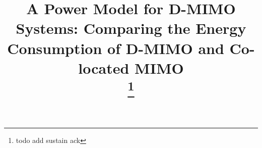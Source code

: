 \documentclass[conference]{IEEEtran}
\theoremstyle{mystyle}
\begin{document}
\title{A Power Model for D-MIMO Systems: Comparing the Energy Consumption of D-MIMO and Co-located MIMO\\

\thanks{todo add sustain ack
}
}

\author{
}

\end{document}

